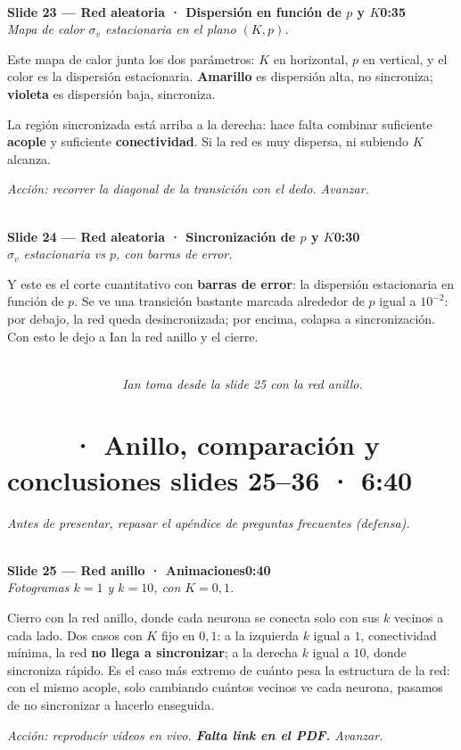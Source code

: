 \documentclass[11pt]{article}
\newcommand{\slide}[3]{%
  \vspace{6pt}%
  \noindent{\color{azulOscuro}\rule{3.2cm}{2pt}}\\[2pt]
  \noindent\textbf{\color{azulOscuro}#1}\hfill\textbf{\color{azulMedio}#3}\\[-2pt]
  {\small\color{grisTexto}\itshape #2}\\[2pt]
}
\newcommand{\quien}[2]{\noindent\colorbox{#1}{\textcolor{white}{\textbf{\;#2\;}}}}
\begin{document}
\slide{Slide 23 — Red aleatoria · Dispersión en función de $p$ y $K$}{Mapa de calor $\sigma_v$ estacionaria en el plano $(K,p)$.}{0:35}
\begin{guion}
Este mapa de calor junta los dos parámetros: $K$ en horizontal, $p$ en vertical, y el color es la dispersión estacionaria. \textbf{Amarillo} es dispersión alta, no sincroniza; \textbf{violeta} es dispersión baja, sincroniza.

La región sincronizada está arriba a la derecha: hace falta combinar suficiente \textbf{acople} y suficiente \textbf{conectividad}. Si la red es muy dispersa, ni subiendo $K$ alcanza.
\end{guion}
\textit{Acción: recorrer la diagonal de la transición con el dedo. Avanzar.}

\slide{Slide 24 — Red aleatoria · Sincronización de $p$ y $K$}{$\sigma_v$ estacionaria vs $p$, con barras de error.}{0:30}
\begin{guion}
Y este es el corte cuantitativo con \textbf{barras de error}: la dispersión estacionaria en función de $p$. Se ve una transición bastante marcada alrededor de $p$ igual a $10^{-2}$: por debajo, la red queda desincronizada; por encima, colapsa a sincronización. Con esto le dejo a Ian la red anillo y el cierre.
\end{guion}

\vspace{8pt}
\hrulefill\\
\quien{ianColor}{RELEVO → IAN} \textit{\quad Ian toma desde la slide 25 con la red anillo.}

\newpage
\section{\quien{ianColor}{IAN} · Anillo, comparación y conclusiones \hfill\normalsize\mdseries slides 25--36 · 6:40}

\textit{\small Antes de presentar, repasar el apéndice de preguntas frecuentes (defensa).}

\slide{Slide 25 — Red anillo · Animaciones}{Fotogramas $k=1$ y $k=10$, con $K=0{,}1$.}{0:40}
\begin{guion}
Cierro con la red anillo, donde cada neurona se conecta solo con sus $k$ vecinos a cada lado. Dos casos con $K$ fijo en $0{,}1$: a la izquierda $k$ igual a $1$, conectividad mínima, la red \textbf{no llega a sincronizar}; a la derecha $k$ igual a $10$, donde sincroniza rápido. Es el caso más extremo de cuánto pesa la estructura de la red: con el mismo acople, solo cambiando cuántos vecinos ve cada neurona, pasamos de no sincronizar a hacerlo enseguida.
\end{guion}
\textit{Acción: reproducir videos en vivo. \textbf{Falta link en el PDF.} Avanzar.}
\end{document}
